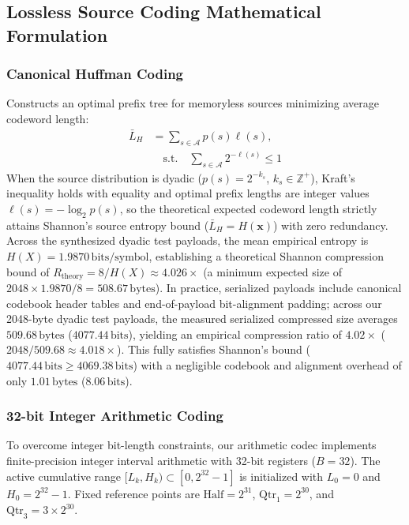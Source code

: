 \documentclass[conference]{IEEEtran}
\begin{document}
\subsection{Lossless Source Coding Mathematical Formulation}
\label{subsec:source_coding}
\subsubsection{Canonical Huffman Coding}
Constructs an optimal prefix tree for memoryless sources minimizing average codeword length:
\begin{equation}
    \begin{split}
    \bar{L}_H &= \sum_{s \in \mathcal{A}} p(s) \ell(s), \\
    &\quad \text{s.t.} \quad \sum_{s \in \mathcal{A}} 2^{-\ell(s)} \le 1
    \end{split}
\end{equation}
When the source distribution is dyadic ($p(s) = 2^{-k_s}$, $k_s \in \mathbb{Z}^+$), Kraft's inequality holds with equality and optimal prefix lengths are integer values $\ell(s) = -\log_2 p(s)$, so the theoretical expected codeword length strictly attains Shannon's source entropy bound ($\bar{L}_H = H(\mathbf{x})$) with zero redundancy. Across the synthesized dyadic test payloads, the mean empirical entropy is $H(X) = 1.9870\,\text{bits/symbol}$, establishing a theoretical Shannon compression bound of $R_{\text{theory}} = 8 / H(X) \approx 4.026\times$ (a minimum expected size of $2048 \times 1.9870 / 8 = 508.67\,\text{bytes}$). In practice, serialized payloads include canonical codebook header tables and end-of-payload bit-alignment padding; across our 2048-byte dyadic test payloads, the measured serialized compressed size averages $509.68\,\text{bytes}$ ($4077.44\,\text{bits}$), yielding an empirical compression ratio of $\mathbf{4.02\times}$ ($2048 / 509.68 \approx 4.018\times$). This fully satisfies Shannon's bound ($4077.44\,\text{bits} \ge 4069.38\,\text{bits}$) with a negligible codebook and alignment overhead of only $1.01\,\text{bytes}$ ($8.06\,\text{bits}$).

\subsubsection{32-bit Integer Arithmetic Coding}
To overcome integer bit-length constraints, our arithmetic codec implements finite-precision integer interval arithmetic with 32-bit registers ($B=32$). The active cumulative range $[L_k, H_k) \subset [0, 2^{32}-1]$ is initialized with $L_0 = 0$ and $H_0 = 2^{32}-1$. Fixed reference points are $\text{Half} = 2^{31}$, $\text{Qtr}_1 = 2^{30}$, and $\text{Qtr}_3 = 3 \times 2^{30}$.
\end{document}

